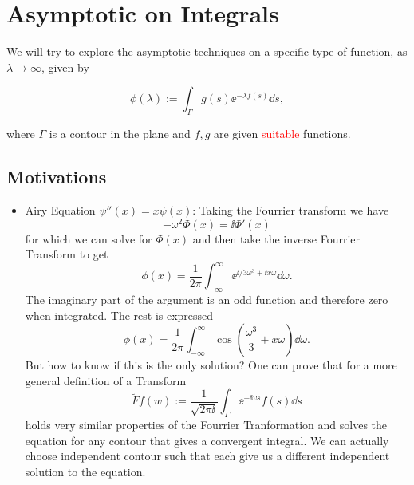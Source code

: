 \section{Asymptotic on Integrals}
 
We will try to explore the asymptotic techniques on a specific type of function, as $\lambda \rightarrow \infty$, given by 

\begin{equation}
	\phi(\lambda) := \int_{\Gamma} g(s) \ee^{-\lambda f(s)} \dd s,
\end{equation}

where $\Gamma$ is a contour in the plane and $f, g$ are given \textcolor{red}{suitable} functions.

\subsection{Motivations}

\begin{itemize}
	\item Airy Equation $\psi''(x) = x \psi(x)$: Taking the Fourrier transform we have $$-\omega^2 \Phi(x) = \ii \Phi'(x)$$ for which we can solve for $\Phi(x) $ and then take the inverse Fourrier Transform to get $$\phi(x) = \frac{1}{2\pi} \int_{-\infty}^{\infty} \ee^{\ii/3 \omega^3 + \ii x \omega} \dd \omega.$$ The imaginary part of the argument is an odd function and therefore zero when integrated. The rest is expressed $$\phi(x) = \frac{1}{2\pi} \int_{-\infty}^{\infty} \cos{\left( \frac{\omega^3}{3} + x \omega \right)} \dd \omega.$$ But how to know if this is the only solution? One can prove that for a more general definition of a Transform $$\tilde{F} f(w) := \frac{1}{\sqrt{2\pi \ii}} \int_{\Gamma} \ee^{-\ii \omega s} f(s) \dd s$$ holds very similar properties of the Fourrier Tranformation and solves the equation for any contour that gives a convergent integral. We can actually choose independent contour such that each give us a different independent solution to the equation.
\end{itemize}